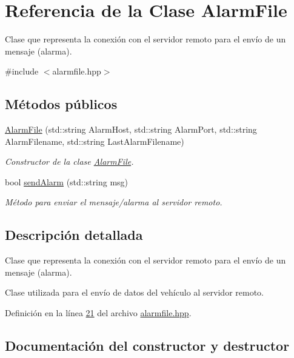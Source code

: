 \hypertarget{classAlarmFile}{}\section{Referencia de la Clase Alarm\+File}
\label{classAlarmFile}


Clase que representa la conexión con el servidor remoto para el envío de un mensaje (alarma).  




{\ttfamily \#include $<$alarmfile.\+hpp$>$}

\subsection*{Métodos públicos}
\begin{DoxyCompactItemize}
\item 
\hyperlink{classAlarmFile_ab5b7a78583764cd70d8b5b93a243439d}{Alarm\+File} (std\+::string Alarm\+Host, std\+::string Alarm\+Port, std\+::string Alarm\+Filename, std\+::string Last\+Alarm\+Filename)
\begin{DoxyCompactList}\small\item\em Constructor de la clase \hyperlink{classAlarmFile}{Alarm\+File}. \end{DoxyCompactList}\item 
bool \hyperlink{classAlarmFile_a37fd701cca3c3458a3009b508383947b}{send\+Alarm} (std\+::string msg)
\begin{DoxyCompactList}\small\item\em Método para enviar el mensaje/alarma al servidor remoto. \end{DoxyCompactList}\end{DoxyCompactItemize}


\subsection{Descripción detallada}
Clase que representa la conexión con el servidor remoto para el envío de un mensaje (alarma). 

Clase utilizada para el envío de datos del vehículo al servidor remoto. 

Definición en la línea \hyperlink{alarmfile_8hpp_source_l00021}{21} del archivo \hyperlink{alarmfile_8hpp_source}{alarmfile.\+hpp}.



\subsection{Documentación del constructor y destructor}
\mbox{\label{classAlarmFile_ab5b7a78583764cd70d8b5b93a243439d}} 
